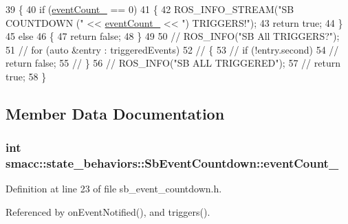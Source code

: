 \begin{DoxyCode}
39 \{
40     \textcolor{keywordflow}{if} (\hyperlink{classsmacc_1_1state__behaviors_1_1SbEventCountdown_add411632e4c39ca6b6f6d6450874004f}{eventCount\_} == 0)
41     \{
42         ROS\_INFO\_STREAM(\textcolor{stringliteral}{"SB COUNTDOWN ("} << \hyperlink{classsmacc_1_1state__behaviors_1_1SbEventCountdown_add411632e4c39ca6b6f6d6450874004f}{eventCount\_} << \textcolor{stringliteral}{") TRIGGERS!"});
43         \textcolor{keywordflow}{return} \textcolor{keyword}{true};
44     \}
45     \textcolor{keywordflow}{else}
46     \{
47         \textcolor{keywordflow}{return} \textcolor{keyword}{false};
48     \}
49 
50     \textcolor{comment}{// ROS\_INFO("SB All TRIGGERS?");}
51     \textcolor{comment}{// for (auto &entry : triggeredEvents)}
52     \textcolor{comment}{// \{}
53     \textcolor{comment}{//     if (!entry.second)}
54     \textcolor{comment}{//         return false;}
55     \textcolor{comment}{// \}}
56     \textcolor{comment}{// ROS\_INFO("SB ALL TRIGGERED");}
57     \textcolor{comment}{// return true;}
58 \}
\end{DoxyCode}


\subsection{Member Data Documentation}
\subsubsection[{\texorpdfstring{event\+Count\+\_\+}{eventCount_}}]{\setlength{\rightskip}{0pt plus 5cm}int smacc\+::state\+\_\+behaviors\+::\+Sb\+Event\+Countdown\+::event\+Count\+\_\+\hspace{0.3cm}{\ttfamily [private]}}\hypertarget{classsmacc_1_1state__behaviors_1_1SbEventCountdown_add411632e4c39ca6b6f6d6450874004f}{}\label{classsmacc_1_1state__behaviors_1_1SbEventCountdown_add411632e4c39ca6b6f6d6450874004f}


Definition at line 23 of file sb\+\_\+event\+\_\+countdown.\+h.



Referenced by on\+Event\+Notified(), and triggers().

